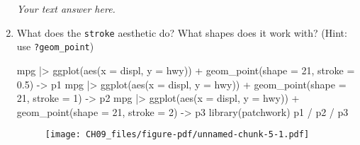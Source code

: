 \documentclass[
  letterpaper,
  DIV=11,
  numbers=noendperiod]{scrreprt}
\newenvironment{Shaded}{\begin{snugshade}}{\end{snugshade}}
\newcommand{\AttributeTok}[1]{\textcolor[rgb]{0.40,0.45,0.13}{#1}}
\newcommand{\DecValTok}[1]{\textcolor[rgb]{0.68,0.00,0.00}{#1}}
\newcommand{\FloatTok}[1]{\textcolor[rgb]{0.68,0.00,0.00}{#1}}
\newcommand{\FunctionTok}[1]{\textcolor[rgb]{0.28,0.35,0.67}{#1}}
\newcommand{\NormalTok}[1]{\textcolor[rgb]{0.00,0.23,0.31}{#1}}
\newcommand{\OtherTok}[1]{\textcolor[rgb]{0.00,0.23,0.31}{#1}}
\newcommand{\SpecialCharTok}[1]{\textcolor[rgb]{0.37,0.37,0.37}{#1}}
\begin{document}
\begin{enumerate}
\begin{tcolorbox}
  \emph{Your text answer here.}

  \end{tcolorbox}
\item
  What does the \texttt{stroke} aesthetic do? What shapes does it work
  with? (Hint: use \texttt{?geom\_point})

  \begin{tcolorbox}[enhanced jigsaw, left=2mm, rightrule=.15mm, bottomtitle=1mm, opacitybacktitle=0.6, leftrule=.75mm, opacityback=0, colframe=quarto-callout-note-color-frame, bottomrule=.15mm, coltitle=black, toptitle=1mm, colback=white, titlerule=0mm, colbacktitle=quarto-callout-note-color!10!white, title={Answer}, toprule=.15mm, breakable, arc=.35mm]

\begin{Shaded}
\begin{Highlighting}[]
\NormalTok{mpg }\SpecialCharTok{|\textgreater{}}
  \FunctionTok{ggplot}\NormalTok{(}\FunctionTok{aes}\NormalTok{(}\AttributeTok{x =}\NormalTok{ displ, }\AttributeTok{y =}\NormalTok{ hwy)) }\SpecialCharTok{+}
    \FunctionTok{geom\_point}\NormalTok{(}\AttributeTok{shape =} \DecValTok{21}\NormalTok{, }\AttributeTok{stroke =} \FloatTok{0.5}\NormalTok{) }\OtherTok{{-}\textgreater{}}\NormalTok{ p1}
\NormalTok{mpg }\SpecialCharTok{|\textgreater{}}
  \FunctionTok{ggplot}\NormalTok{(}\FunctionTok{aes}\NormalTok{(}\AttributeTok{x =}\NormalTok{ displ, }\AttributeTok{y =}\NormalTok{ hwy)) }\SpecialCharTok{+}
    \FunctionTok{geom\_point}\NormalTok{(}\AttributeTok{shape =} \DecValTok{21}\NormalTok{, }\AttributeTok{stroke =} \DecValTok{1}\NormalTok{) }\OtherTok{{-}\textgreater{}}\NormalTok{ p2}
\NormalTok{mpg }\SpecialCharTok{|\textgreater{}}
  \FunctionTok{ggplot}\NormalTok{(}\FunctionTok{aes}\NormalTok{(}\AttributeTok{x =}\NormalTok{ displ, }\AttributeTok{y =}\NormalTok{ hwy)) }\SpecialCharTok{+}
    \FunctionTok{geom\_point}\NormalTok{(}\AttributeTok{shape =} \DecValTok{21}\NormalTok{, }\AttributeTok{stroke =} \DecValTok{2}\NormalTok{) }\OtherTok{{-}\textgreater{}}\NormalTok{ p3}
\FunctionTok{library}\NormalTok{(patchwork)}
\NormalTok{p1 }\SpecialCharTok{/}\NormalTok{ p2 }\SpecialCharTok{/}\NormalTok{ p3}
\end{Highlighting}
\end{Shaded}

  \begin{figure}[H]

  {\centering \texttt{[image: CH09\_files/figure-pdf/unnamed-chunk-5-1.pdf]}

  }


\end{figure}
\end{tcolorbox}
\end{enumerate}
\end{document}
